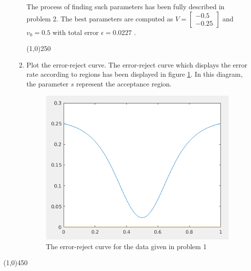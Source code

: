 \documentclass[12pt]{article}
\newcommand{\svector}[2]{\left[ \begin{matrix} #1 \\ #2 \end{matrix}\right]}
\begin{document}
\begin{enumerate}
\begin{enumerate}
The process of finding such parameters has been fully described in problem 2. The best parameters are computed as $V = \svector{-0.5}{-0.25}$ and $v_0 = 0.5$ with total error $\epsilon = 0.0227$ .

\begin{center}
\line(1,0){250}
\end{center}

\item Plot the error-reject curve.
The error-reject curve which displays the error rate according to regions has been displayed in figure \ref{fig:1-4}. In this diagram, the parameter $s$ represent the acceptance region.
\begin{figure}[h]
\centering
\includegraphics[scale=0.5]{Imgs/1-4.png}
\caption{The error-reject curve for the data given in problem 1}
\label{fig:1-4}

\end{figure}

\end{enumerate} 
\end{enumerate}


\begin{center}
\line(1,0){450}
\end{center}



\end{document}
